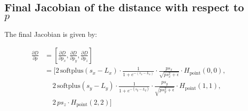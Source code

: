 \documentclass[11pt]{article}
\begin{document}
        \subsection*{Final Jacobian of the distance with respect to \(p\)}
        The final Jacobian  is given by:

        \begin{equation}
            \begin{aligned}
                \frac{\partial D}{\partial p} &= \left[\frac{\partial D}{\partial p_{x}}, \frac{\partial D}{\partial p_{y}}, \frac{\partial D}{\partial p_{z}}\right] \\
                &= \Bigg[
                    2\,\text{softplus}(s_x - L_x) \cdot \frac{1}{1 + e^{-(s_x - L_x)}} \cdot \frac{ps_{x}}{\sqrt{ps_{x}^2 + \epsilon}} \cdot H_{\text{point}}(0,0), \\
                    &\quad\, 2\,\text{softplus}(s_y - L_y) \cdot \frac{1}{1 + e^{-(s_y - L_y)}} \cdot \frac{ps_{y}}{\sqrt{ps_{y}^2 + \epsilon}} \cdot H_{\text{point}}(1,1), \\
                    &\quad\, 2\,ps_{z} \cdot H_{\text{point}}(2,2)
                    \Bigg]
            \end{aligned}
        \end{equation}
\end{document}
